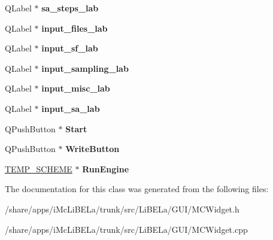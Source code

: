 \begin{DoxyCompactItemize}
\item 
\hypertarget{classMCWidget_ac3cd039f0afc134124a87d9e94ce4602}{
QLabel $\ast$ {\bfseries sa\_\-steps\_\-lab}}
\label{classMCWidget_ac3cd039f0afc134124a87d9e94ce4602}

\item 
\hypertarget{classMCWidget_a09dc9bf33089c3ba05b9d4d5b31b33b2}{
QLabel $\ast$ {\bfseries input\_\-files\_\-lab}}
\label{classMCWidget_a09dc9bf33089c3ba05b9d4d5b31b33b2}

\item 
\hypertarget{classMCWidget_adfaa1971eee1b47a7989e89c835e0dd2}{
QLabel $\ast$ {\bfseries input\_\-sf\_\-lab}}
\label{classMCWidget_adfaa1971eee1b47a7989e89c835e0dd2}

\item 
\hypertarget{classMCWidget_ae1c5cc4c1bcdb79a2bad38383d143a74}{
QLabel $\ast$ {\bfseries input\_\-sampling\_\-lab}}
\label{classMCWidget_ae1c5cc4c1bcdb79a2bad38383d143a74}

\item 
\hypertarget{classMCWidget_a2b785e1f53677f3a54a98bf1f7a1a923}{
QLabel $\ast$ {\bfseries input\_\-misc\_\-lab}}
\label{classMCWidget_a2b785e1f53677f3a54a98bf1f7a1a923}

\item 
\hypertarget{classMCWidget_a03a4714535e7968b4622b22cc581c61c}{
QLabel $\ast$ {\bfseries input\_\-sa\_\-lab}}
\label{classMCWidget_a03a4714535e7968b4622b22cc581c61c}

\item 
\hypertarget{classMCWidget_a7a7c59995dcb259da49028b72af8188f}{
QPushButton $\ast$ {\bfseries Start}}
\label{classMCWidget_a7a7c59995dcb259da49028b72af8188f}

\item 
\hypertarget{classMCWidget_a23b16ff02a1e1e667a8ea5d851111205}{
QPushButton $\ast$ {\bfseries WriteButton}}
\label{classMCWidget_a23b16ff02a1e1e667a8ea5d851111205}

\item 
\hypertarget{classMCWidget_a80a1cb5fe51b6cdb5d0c4838ee651a48}{
\hyperlink{classTEMP__SCHEME}{TEMP\_\-SCHEME} $\ast$ {\bfseries RunEngine}}
\label{classMCWidget_a80a1cb5fe51b6cdb5d0c4838ee651a48}

\end{DoxyCompactItemize}


The documentation for this class was generated from the following files:\begin{DoxyCompactItemize}
\item 
/share/apps/iMcLiBELa/trunk/src/LiBELa/GUI/MCWidget.h\item 
/share/apps/iMcLiBELa/trunk/src/LiBELa/GUI/MCWidget.cpp\end{DoxyCompactItemize}
